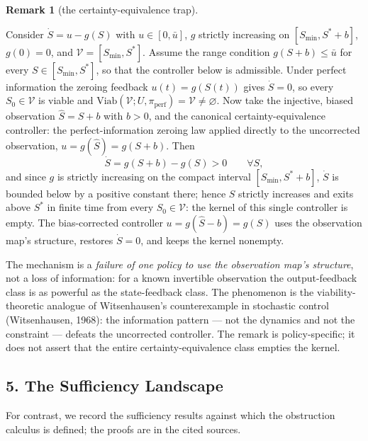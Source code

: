 \documentclass[10pt,twocolumn]{article}
\theoremstyle{definition}
\newtheorem{remark}{Remark}
\begin{document}
\begin{remark}[the certainty-equivalence trap]\label{calc-rem:ce-trap}

Consider \(\dot S = u - g(S)\) with \(u \in [0, \bar u]\), \(g\) strictly
increasing on \([S_{\min}, S^* + b]\), \(g(0) = 0\), and
\(\mathcal{V} = [S_{\min}, S^*]\). Assume the range condition
\(g(S + b) \le \bar u\) for every \(S \in [S_{\min}, S^*]\), so that the
controller below is admissible. Under perfect information the zeroing
feedback \(u(t) = g(S(t))\) gives \(\dot S = 0\), so every
\(S_0 \in \mathcal{V}\) is viable and
\(\mathrm{Viab}(\mathcal{V}; U, \pi_{\mathrm{perf}}) = \mathcal{V} \neq \varnothing\).
Now take the injective, biased observation \(\hat S = S + b\) with
\(b > 0\), and the canonical certainty-equivalence controller: the
perfect-information zeroing law applied directly to the uncorrected
observation, \(u = g(\hat S) = g(S + b)\). Then
\[\dot S = g(S + b) - g(S) > 0 \qquad \forall S,\]
and since \(g\) is strictly increasing on the compact interval
\([S_{\min}, S^* + b]\), \(\dot S\) is bounded below by a positive
constant there; hence \(S\) strictly increases and exits above \(S^*\) in
finite time from every \(S_0 \in \mathcal{V}\): the kernel of this single
controller is empty. The bias-corrected controller
\(u = g(\hat S - b) = g(S)\) uses the observation map's structure, restores
\(\dot S = 0\), and keeps the kernel nonempty.

The mechanism is a \emph{failure of one policy to use the observation
map's structure}, not a loss of information: for a known invertible
observation the output-feedback class is as powerful as the
state-feedback class. The phenomenon is the viability-theoretic analogue
of Witsenhausen's counterexample in stochastic control (Witsenhausen,
1968): the information pattern --- not the dynamics and not the
constraint --- defeats the uncorrected controller. The remark is
policy-specific; it does not assert that the entire certainty-equivalence
class empties the kernel.

\end{remark}





\subsection{5. The Sufficiency Landscape}\label{calc-the-sufficiency-landscape-cited}

For contrast, we record the sufficiency results against which the obstruction calculus is defined; the proofs are in the cited sources.
\end{document}
